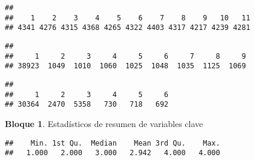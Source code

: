 \documentclass[
]{book}
\newenvironment{Shaded}{\begin{snugshade}}{\end{snugshade}}
\newcommand{\FunctionTok}[1]{\textcolor[rgb]{0.00,0.00,0.00}{#1}}
\newcommand{\NormalTok}[1]{#1}
\newcommand{\SpecialCharTok}[1]{\textcolor[rgb]{0.00,0.00,0.00}{#1}}
\theoremstyle{definition}
\theoremstyle{definition}
\newtheorem{example}{Bloque}[chapter]
\theoremstyle{definition}
\theoremstyle{definition}
\theoremstyle{remark}
\begin{document}
\begin{verbatim}
## 
##    1    2    3    4    5    6    7    8    9   10   11 
## 4341 4276 4315 4368 4265 4322 4403 4317 4217 4239 4281
\end{verbatim}

\begin{Shaded}
\end{Shaded}

\begin{verbatim}
## 
##     1     2     3     4     5     6     7     8     9 
## 38923  1049  1010  1060  1025  1048  1035  1125  1069
\end{verbatim}

\begin{Shaded}
\end{Shaded}

\begin{verbatim}
## 
##     1     2     3     4     5     6 
## 30364  2470  5358   730   718   692
\end{verbatim}

\begin{example}
\protect\hypertarget{exm:bloque37nbm}{}\label{exm:bloque37nbm}Estadísticos de resumen de variables clave
\end{example}

\begin{Shaded}
\end{Shaded}

\begin{verbatim}
##    Min. 1st Qu.  Median    Mean 3rd Qu.    Max. 
##   1.000   2.000   3.000   2.942   4.000   4.000
\end{verbatim}

\begin{Shaded}
\end{Shaded}
\end{document}
